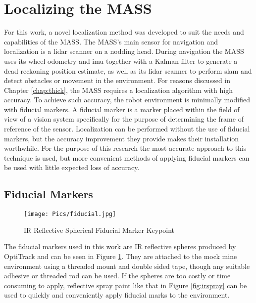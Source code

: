 \section{Localizing the MASS}

For this work, a novel localization method was developed to suit the needs and capabilities of the MASS. The MASS's main sensor for navigation and localization is a \acrshort{lidar} scanner on a nodding head. During navigation the MASS uses its wheel odometry and \acrshort{imu} together with a Kalman filter to generate a dead reckoning position estimate, as well as its \acrshort{lidar} scanner to perform \acrshort{slam} and detect obstacles or movement in the environment. For reasons discussed in Chapter \ref{chap:thick}, the MASS requires a localization algorithm with high accuracy. To achieve such accuracy, the robot environment is minimally modified with fiducial markers. A fiducial marker is a marker placed within the field of view of a vision system specifically for the purpose of determining the frame of reference of the sensor. Localization can be performed without the use of fiducial markers, but the accuracy improvement they provide makes their installation worthwhile. For the purpose of this research the most accurate approach to this technique is used, but more convenient methods of applying fiducial markers can be used with little expected loss of accuracy.\\

\subsection{Fiducial Markers}

\begin{figure}
    \centering
    \texttt{[image: Pics/fiducial.jpg]}
    \caption{IR Reflective Spherical Fiducial Marker Keypoint}
    \label{fig:fiducial}
\end{figure}

The fiducial markers used in this work are IR reflective spheres produced by OptiTrack and can be seen in Figure \ref{fig:fiducial}. They are attached to the mock mine environment using a threaded mount and double sided tape, though any suitable adhesive or threaded rod can be used. If the spheres are too costly or time consuming to apply, reflective spray paint like that in Figure \ref{fig:irspray} can be used to quickly and conveniently apply fiducial marks to the environment.\\

